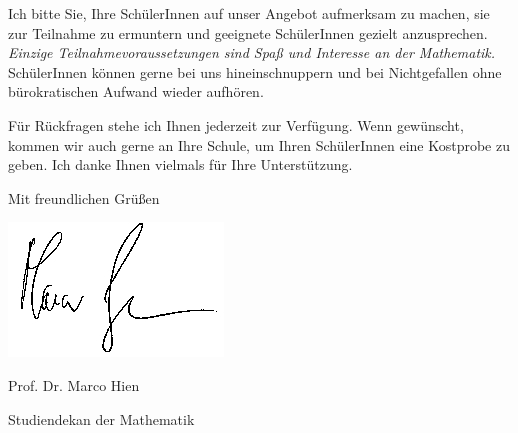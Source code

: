 \documentclass{zirkelbrief}
\begin{document}
Ich bitte Sie, Ihre SchülerInnen auf unser Angebot aufmerksam zu machen, sie zur
Teilnahme zu ermuntern und geeignete SchülerInnen gezielt
anzusprechen. \emph{Einzige Teilnahmevoraussetzungen sind Spaß und
Interesse an der Mathematik.} SchülerInnen können gerne bei uns
hineinschnuppern und bei Nichtgefallen ohne bürokratischen Aufwand wieder
aufhören.

Für Rückfragen stehe ich Ihnen jederzeit zur Verfügung. Wenn gewünscht, kommen wir auch
gerne an Ihre Schule, um Ihren SchülerInnen eine Kostprobe zu geben. Ich danke
Ihnen vielmals für Ihre Unterstützung.

Mit freundlichen Grüßen
\vspace{0.0cm}

\hspace{1cm} \includegraphics[scale=0.4]{unterschrift_marco_hien}

\vspace{-0.4cm}

Prof. Dr. Marco Hien

\vspace{-0.2cm}

{\small Studiendekan der Mathematik}
\end{document}
